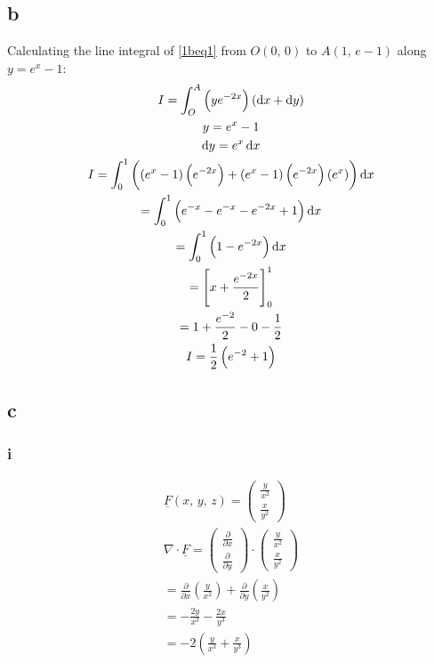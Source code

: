 \documentclass[11pt]{article}
\numberwithin{equation}{section}
\begin{document}
\subsection{b}
Calculating the line integral of \ref{1beq1} from $O\left(0, \, 0\right)$ to $A(1, \, e-1)$ along $y=e^x -1$:
\begin{gather}
    I = \int_O^A \left(ye^{-2x}\right)\left(\dif x + \dif y\right) \label{1beq1}\\
    y = e^x - 1\\
    \dif y = e^x \dif x\\
    I = \int_0^1 \left( \left( e^x-1\right) \left( e^{-2x} \right) + \left( e^x-1\right)\left( e^{-2x}\right)\left( e^x\right)\right)\dif x \\
    = \int_0^1 \left(e^{-x} - e^{-x} - e^{-2x} +1\right)\dif x\\
    = \int_0^1 \left(1-e^{-2x}\right)\dif x \\
    = \left[x + \frac{e^{-2x}}{2}\right]_0^1\\
    = 1 + \frac{e^{-2}}{2} -0-\frac{1}{2}\\
    I = \frac{1}{2}\left(e^{-2}+1\right)
\end{gather}
\subsection{c}
\subsubsection{i}
\begin{gather}
    \underline{F}\left(x, \, y, \, z\right) = \begin{pmatrix}
        \frac{y}{x^2}\\
        \frac{x}{y^2}
    \end{pmatrix}\\
    \nabla \cdot \underline{F} = \begin{pmatrix}
        \frac{\partial}{\partial x}\\
        \frac{\partial}{\partial y}
    \end{pmatrix} \cdot \begin{pmatrix}
        \frac{y}{x^2}\\
        \frac{x}{y^2}
    \end{pmatrix}\\
    = \frac{\partial}{\partial x}\left(\frac{y}{x^2}\right) + \frac{\partial}{\partial y} \left(\frac{x}{y^2}\right)\\
    = -\frac{2y}{x^3}-\frac{2x}{y^3} \\
    = -2\left(\frac{y}{x^3}+\frac{x}{y^3}\right)
\end{gather}
\end{document}
